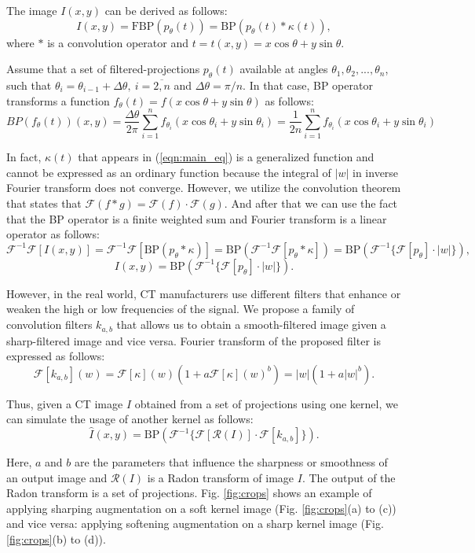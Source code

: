 The image $I(x, y)$ can be derived as follows:
\begin{equation}
	\label{eqn:main_eq}
	I(x, y) = \text{FBP}(p_\theta(t)) = \text{BP}(p_\theta(t) * \kappa(t)),
\end{equation}
where $*$ is a convolution operator and $t = t(x,y) = x\cos\theta + y\sin\theta$.%

Assume that a set of filtered-projections $p_{\theta}(t)$ available at angles $\theta_1, \theta_2, ..., \theta_n$, such that $\theta_i = \theta_{i - 1} + \Delta\theta,~i=\overline{2,n}$ and $\Delta\theta = \pi / n$. In that case, BP operator transforms a function $f_\theta(t) = f(x\cos\theta + y\sin\theta)$ as follows:
\[
BP(f_\theta(t))(x, y) = \frac{\Delta\theta}{2\pi}\sum\limits_{i=1}^n f_{\theta_i}(x\cos\theta_i + y\sin\theta_i) = \frac{1}{2n}\sum\limits_{i=1}^n f_{\theta_i}(x\cos\theta_i + y\sin\theta_i)
\]

In fact, $\kappa(t)$ that appears in (\ref{eqn:main_eq}) is a generalized function and cannot be expressed as an ordinary function because the integral of $|w|$ in inverse Fourier transform does not converge. However, we utilize the convolution theorem that states that $\mathcal{F}(f*g) = \mathcal{F}(f)\cdot\mathcal{F}(g)$. And after that we can use the fact that the BP operator is a finite weighted sum and Fourier transform is a linear operator as follows:
\[
\mathcal{F}^{-1}\mathcal{F}[I(x, y)] = \mathcal{F}^{-1}\mathcal{F}[\text{BP}(p_\theta * \kappa)] = \text{BP}(\mathcal{F}^{-1}\mathcal{F}[p_\theta * \kappa]) = \text{BP}(\mathcal{F}^{-1}\{\mathcal{F}[p_\theta]\cdot|w|\}),\]
\[I(x, y) = \text{BP}\left(\mathcal{F}^{-1}\{\mathcal{F}[p_\theta]\cdot|w|\}\right).\]

However, in the real world, CT manufacturers use different filters that enhance or weaken the high or low frequencies of the signal. We propose a family of convolution filters $k_{a,b}$ that allows us to obtain a smooth-filtered image given a sharp-filtered image and vice versa. Fourier transform of the proposed filter is expressed as follows:
\[\mathcal{F}[k_{a,b}](w) = \mathcal{F}[\kappa](w)(1 + a \mathcal{F}[\kappa](w)^b) = |w|(1 + a|w|^b).\]

Thus, given a CT image $I$ obtained from a set of projections using one kernel, we can simulate the usage of another kernel as follows:
\[\hat{I}(x, y) = \text{BP}\left(\mathcal{F}^{-1}\{\mathcal{F}[\mathcal{R}(I)]\cdot\mathcal{F}[k_{a,b}]\}\right).\]

Here, $a$ and $b$ are the parameters that influence the sharpness or smoothness of an output image and $\mathcal{R}(I)$ is a Radon transform of image $I$. The output of the Radon transform is a set of projections. Fig. \ref{fig:crops} shows an example of applying sharping augmentation on a soft kernel image (Fig. \ref{fig:crops}(a) to (c)) and vice versa: applying softening augmentation on a sharp kernel image (Fig. \ref{fig:crops}(b) to (d)). 


